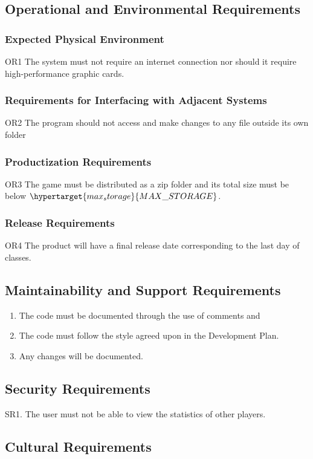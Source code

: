 \documentclass[12pt, titlepage]{article}
\begin{document}
	\subsection{Operational and Environmental Requirements}
	\subsubsection{Expected Physical Environment}
	OR1 The system must not require an internet connection nor should it 
	require 
	high-performance graphic cards.
	\subsubsection{Requirements for Interfacing with Adjacent Systems}
	OR2 The program should not access and make changes to any file outside its 
	own 
	folder
	\subsubsection{Productization Requirements}
	OR3 The game must be distributed as a zip folder and its total size must be 
	below $\hypertarget{max_storage}{MAX\_STORAGE}$.
	\subsubsection{Release Requirements}
	OR4 The product will have a final release date corresponding to the last 
	day 
	of 
	classes.
	\subsection{Maintainability and Support Requirements}
	\begin{enumerate}[label=M\arabic*]
		\item The code must be documented through the use of comments and 
		\item The code must follow the style agreed upon in the Development 
		Plan.
		\item Any changes will be documented.  
	\end{enumerate}
	
	\subsection{Security Requirements}
	
	SR1. The user must not be able to view the statistics of other players.
	
	\subsection{Cultural Requirements}
\end{document}
